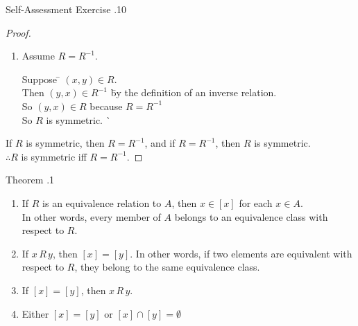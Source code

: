 \documentclass[../notes.tex]{subfiles}
\begin{document}
\begin{exercise}{Self-Assessment Exercise \thechapter.10}
\begin{enumerate}
\begin{proof}
\begin{enumerate}[label=(\roman*)]
									\item {}
										\begin{subproof}
											Assume $R = R^{-1}$.
											\begin{tabbing}
												Suppose \quad \= $(x, y) \in R$.\\
												Then \>$(y, x) \in R^{-1}$ \quad \= by the definition of an inverse relation.\\
												So \>$(y, x) \in R$ \> because $R = R^{-1}$\\
												So \> $R$ is symmetric. \` \qedhere
											\end{tabbing}
										\end{subproof}
								\end{enumerate}
								If $R$ is symmetric, then $R = R^{-1}$, and if $R = R^{-1}$, then $R$ is symmetric.\\
								$\therefore R$ is symmetric iff $R = R^{-1}$.
							\end{proof}
					\end{enumerate}
				\end{exercise}
				\pagebreak
				\begin{theorem}{Theorem \thechapter.1}
					\begin{enumerate}[label=(\roman*)]
						\item If $R$ is an equivalence relation to $A$, then $x \in [x]$ for each $x \in A$.\\
							In other words, every member of $A$ belongs to an equivalence class with respect to $R$.
						\item If $x\, R \, y$, then $[x] = [y]$. In other words, if two elements are equivalent with respect to $R$, they belong to the same equivalence class.
						\item If $[x] = [y]$, then $x \, R \, y$.
						\item Either $[x] = [y]$ or $[x] \cap [y] = \emptyset$
					\end{enumerate}
				\end{theorem}
\end{document}
